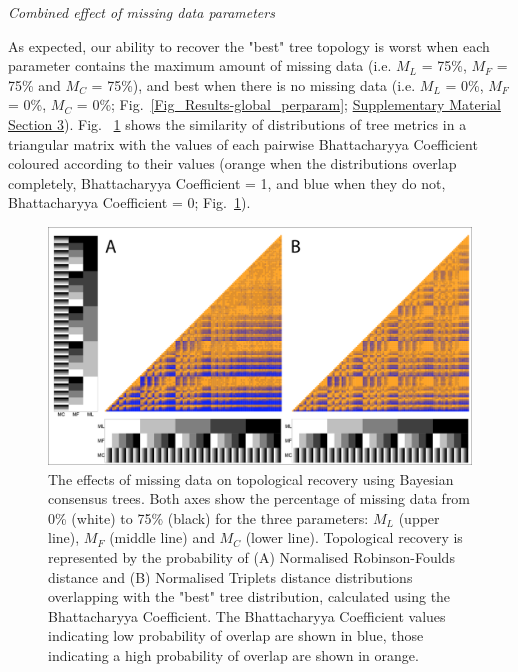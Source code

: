 \documentclass[12pt,letterpaper]{article}
\renewcommand{\subsection}[1]{%
\bigskip
\begin{center}
\begin{large}
\normalfont\itshape #1
\end{large}
\end{center}}
\begin{document}
\subsection{Combined effect of missing data parameters}
As expected, our ability to recover the "best" tree topology is worst when each parameter contains the maximum amount of missing data (i.e. $M_{L}$ = 75\%, $M_{F}$ = 75\% and $M_{C}$ = 75\%), and best when there is no missing data (i.e. $M_{L}$ = 0\%, $M_{F}$ = 0\%, $M_{C}$ = 0\%; Fig.~\ref{Fig_Results-global_perparam}; \hyperref[SupplementaryMaterial]{Supplementary Material Section 3}). Fig. ~\ref{Fig_Results-paircomp_within} shows the similarity of distributions of tree metrics in a triangular matrix with the values of each pairwise Bhattacharyya Coefficient coloured according to their values (orange when the distributions overlap completely, Bhattacharyya Coefficient = 1, and blue when they do not, Bhattacharyya Coefficient = 0; Fig.~\ref{Fig_Results-paircomp_within}). 

\begin{figure} 
\centering
    \includegraphics[width=1\textwidth]{Figures/In_main/PairwiseComp-Baycon-RF+Tr-colour.png} %
\caption{The effects of missing data on topological recovery using Bayesian consensus trees. Both axes show the percentage of missing data from 0\% (white) to 75\% (black) for the three parameters: $M_{L}$ (upper line), $M_{F}$ (middle line) and $M_{C}$ (lower line). Topological recovery is represented by the probability of (A) Normalised Robinson-Foulds distance and (B) Normalised Triplets distance distributions overlapping with the "best" tree distribution, calculated using the Bhattacharyya Coefficient. The Bhattacharyya Coefficient values indicating low probability of overlap are shown in blue, those indicating a high probability of overlap are shown in orange.}
\label{Fig_Results-paircomp_within}
\end{figure} %
\end{document}
